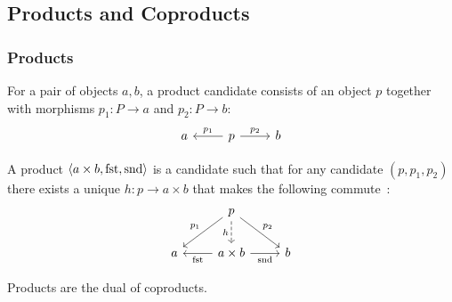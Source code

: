 \subsection{Products and Coproducts}

\subsubsection*{Products}

\begin{definition}

	For a pair of objects $a, b$, a product candidate consists of an object $p$
	together with morphisms $p_1: P\to a$ and $p_2:P\to b$:
	\[\begin{tikzcd}[ampersand replacement=\&]
		a \& p \& b
		\arrow["{p_1}"', from=1-2, to=1-1]
		\arrow["{p_2}", from=1-2, to=1-3]
	\end{tikzcd}\]

	A product $\langle a\times b, \mathrm{fst}, \mathrm{snd}\rangle$ is a candidate such that
	for any candidate $(p, p_1, p_2)$ there exists a unique $h: p\to a\times b$
	that makes the following commute~\parencite{leinster:basic_category_theory}:
	\[\begin{tikzcd}[ampersand replacement=\&]
		\& p \\
		a \& {a\times b} \& b
		\arrow["{\mathrm{fst}}", from=2-2, to=2-1]
		\arrow["{\mathrm{snd}}"', from=2-2, to=2-3]
		\arrow["{p_1}"', from=1-2, to=2-1]
		\arrow["{p_2}", from=1-2, to=2-3]
		\arrow["h"', dashed, from=1-2, to=2-2]
	\end{tikzcd}\]
\end{definition}

\begin{remark}
	Products are the dual of coproducts.
\end{remark}

